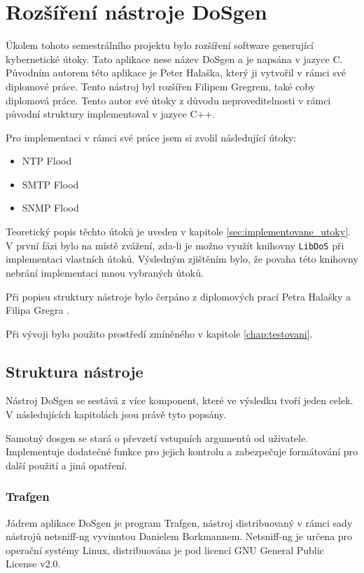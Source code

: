 \chapter{Rozšíření nástroje DoSgen}
Úkolem tohoto semestrálního projektu bylo rozšíření software generující kybernetické útoky. Tato aplikace nese název DoSgen a je napsána v jazyce C. Původním autorem této aplikace je Peter Halaška, který ji vytvořil v rámci své diplomové práce. Tento nástroj byl rozšířen Filipem Gregrem, také coby diplomová práce. Tento autor své útoky z důvodu neproveditelnosti v rámci původní struktury implementoval v jazyce C++.

Pro implementaci v rámci své práce jsem si zvolil následující útoky:
\begin{itemize}
	\item{NTP Flood}
	\item{SMTP Flood} %
	\item{SNMP Flood}
\end{itemize}

Teoretický popis těchto útoků je uveden v kapitole \ref{sec:implementovane_utoky}. V první fázi bylo na místě zvážení, zda-li je možno využít knihovny \texttt{LibDoS} při implementaci vlastních útoků. Výsledným zjištěním bylo, že povaha této knihovny nebrání implementaci mnou vybraných útoků.

Při popisu struktury nástroje bylo čerpáno z diplomových prací Petra Halašky \cite{Halaska2016} a Filipa Gregra \cite{Gregr2017}.

Při vývoji bylo použito prostředí zmíněného v kapitole \ref{chap:testovani}.

\section{Struktura nástroje}
Nástroj DoSgen se sestává z více komponent, které ve výsledku tvoří jeden celek. V následujících kapitolách jsou právě tyto popsány.

Samotný dosgen se stará o převzetí vstupních argumentů od uživatele. Implementuje dodatečné funkce pro jejich kontrolu a zabezpečuje formátování pro další použití a jiná opatření.

\subsection{Trafgen}
Jádrem aplikace DoSgen je program Trafgen, nástroj distribuovaný v rámci sady nástrojů netsniff-ng vyvinutou Danielem Borkmannem. Netsniff-ng je určena pro operační systémy Linux, distribuována je pod licencí GNU General Public License v2.0.

